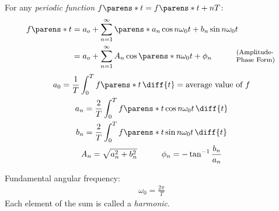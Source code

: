 \begin{multicols}{2}
\begin{CheatsheetEntryFrame}
    \end{CheatsheetEntryFrame}

    \begin{CheatsheetEntryFrame}



    \end{CheatsheetEntryFrame}

    
\end{multicols}
\newpage
\begin{multicols}{2}

    \begin{CheatsheetEntryFrame}


        For any \emph{periodic function} $f \parens*{t} = f \parens*{t + n T}$:
        \begin{align*}
            f \parens*{t}
            &= a_o
            + \sum_{n=1}^\infty \parens*{
                a_n \cos n \omega_0 t + b_n \sin n \omega_0 t
            }
            \\
            &= a_o
            + \sum_{n=1}^\infty {
                A_n \cos \parens*{n \omega_0 t + \phi_n}
            }
            \qquad\quad \text{\parbox{5em}{\footnotesize{}(Amplitude-Phase Form)}}
        \end{align*}
        \begin{gather*}
            a_0
            = \frac{1}{T} \int_0^T f\parens*{t} \,\diff{t} = \text{average value of $f$}
            \\
            a_n
            = \frac{2}{T} \int_0^T f\parens*{t} \cos n \omega_0 t \,\diff{t}
            \\
            b_n
            = \frac{2}{T} \int_0^T f\parens*{t} \sin n \omega_0 t \,\diff{t}
            \\
            A_n = \sqrt{a_n^2 + b_n^2}
            \qquad\quad
            \phi_n = - \tan^{-1} \frac{b_n}{a_n}
        \end{gather*}

        Fundamental angular frequency:
        \begin{gather*}
            \omega_0 = \frac{2 \pi}{T}
        \end{gather*}
        Each element of the sum is called a \emph{harmonic}.


\end{CheatsheetEntryFrame}
\end{multicols}
